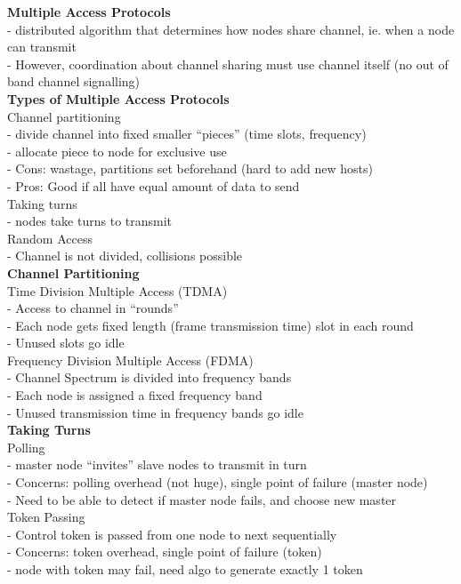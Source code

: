 \documentclass[10pt, a4paper]{article}
\newcommand{\blue}[1]{{\color{MidnightBlue}#1}}
\newcommand{\red}[1]{{\color{red}#1}}
\newcommand{\green}[1]{{\color{ForestGreen}#1}}
\begin{document}
\begin{multicols*}{3}
		\textbf{Multiple Access Protocols}\\
		- distributed algorithm that determines how nodes share channel, ie. when a node can transmit\\
		- However, coordination about channel sharing must use channel itself (no out of band channel signalling)\\
		\textbf{Types of Multiple Access Protocols}\\
		\red{Channel partitioning}\\
		- divide channel into fixed smaller ``pieces'' (time slots, frequency)\\
		- allocate piece to node for exclusive use\\
		- \red{Cons:} wastage, partitions set beforehand (hard to add new hosts)\\
		- \green{Pros:} Good if all have equal amount of data to send\\
		\red{Taking turns}\\
		- nodes take turns to transmit\\
		\red{Random Access}\\
		- Channel is not divided, collisions possible\\

		\textbf{Channel Partitioning}\\
		Time Division Multiple Access (TDMA)\\
		- Access to channel in ``rounds''\\
		- Each node gets fixed length (frame transmission time) slot in each round\\
		- \blue{Unused slots go idle}\\
		Frequency Division Multiple Access (FDMA)\\
		- Channel Spectrum is divided into frequency bands\\
		- Each node is assigned a fixed frequency band\\
		- Unused transmission time in frequency bands go idle\\

		\textbf{Taking Turns}\\
		Polling\\
		- master node ``invites'' slave nodes to transmit in turn\\
		- Concerns: polling overhead (not huge), single point of failure (master node)\\
		- Need to be able to detect if master node fails, and choose new master\\
		Token Passing\\
		- Control token is passed from one node to next sequentially\\
		- Concerns: token overhead, single point of failure (token)\\
		- node with token may fail, need algo to generate exactly 1 token\\


\end{multicols*}
\end{document}
